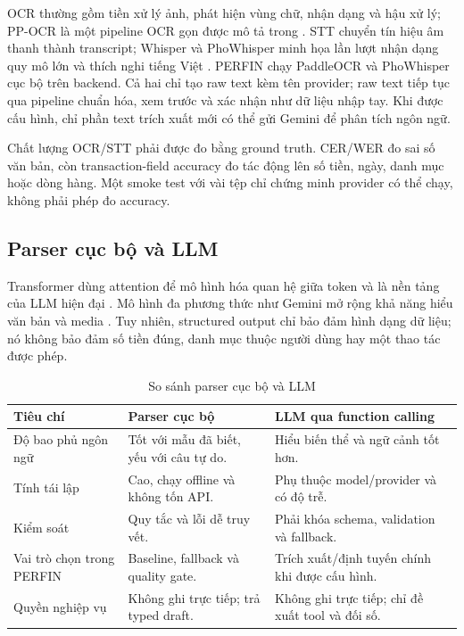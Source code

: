OCR thường gồm tiền xử lý ảnh, phát hiện vùng chữ, nhận dạng và hậu xử lý; PP-OCR là một pipeline OCR gọn được mô tả trong \cite{ppocr2020}. STT chuyển tín hiệu âm thanh thành transcript; Whisper và PhoWhisper minh họa lần lượt nhận dạng quy mô lớn và thích nghi tiếng Việt \cite{radford2022,phowhisper2024}. PERFIN chạy PaddleOCR và PhoWhisper cục bộ trên backend. Cả hai chỉ tạo raw text kèm tên provider; raw text tiếp tục qua pipeline chuẩn hóa, xem trước và xác nhận như dữ liệu nhập tay. Khi được cấu hình, chỉ phần text trích xuất mới có thể gửi Gemini để phân tích ngôn ngữ.

Chất lượng OCR/STT phải được đo bằng ground truth. CER/WER đo sai số văn bản, còn transaction-field accuracy đo tác động lên số tiền, ngày, danh mục hoặc dòng hàng. Một smoke test với vài tệp chỉ chứng minh provider có thể chạy, không phải phép đo accuracy.

\subsection{Parser cục bộ và LLM}

Transformer dùng attention để mô hình hóa quan hệ giữa token và là nền tảng của LLM hiện đại \cite{vaswani2017}. Mô hình đa phương thức như Gemini mở rộng khả năng hiểu văn bản và media \cite{gemini2023}. Tuy nhiên, structured output chỉ bảo đảm hình dạng dữ liệu; nó không bảo đảm số tiền đúng, danh mục thuộc người dùng hay một thao tác được phép.

\begin{table}[H]
  \centering
  \caption{So sánh parser cục bộ và LLM}
  \label{tab:parser-llm-comparison}
  \begin{tabularx}{\textwidth}{@{}L{3.0cm}Y Y@{}}
    \toprule
    \textbf{Tiêu chí} & \textbf{Parser cục bộ} & \textbf{LLM qua function calling} \\
    \midrule
    Độ bao phủ ngôn ngữ & Tốt với mẫu đã biết, yếu với câu tự do. & Hiểu biến thể và ngữ cảnh tốt hơn. \\
    Tính tái lập & Cao, chạy offline và không tốn API. & Phụ thuộc model/provider và có độ trễ. \\
    Kiểm soát & Quy tắc và lỗi dễ truy vết. & Phải khóa schema, validation và fallback. \\
    Vai trò chọn trong PERFIN & Baseline, fallback và quality gate. & Trích xuất/định tuyến chính khi được cấu hình. \\
    Quyền nghiệp vụ & Không ghi trực tiếp; trả typed draft. & Không ghi trực tiếp; chỉ đề xuất tool và đối số. \\
    \bottomrule
  \end{tabularx}
\end{table}


